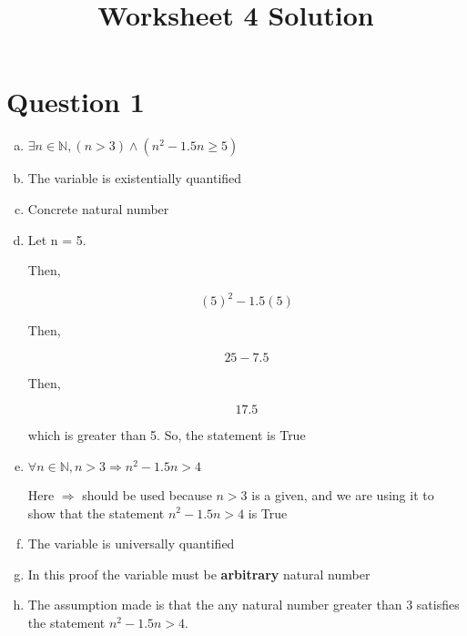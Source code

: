 \documentclass[12pt]{article}
\begin{document}
\title{Worksheet 4 Solution}
\maketitle

\section*{Question 1}
\begin{enumerate}[a.]
    \item $\exists n \in \mathbb{N}, (n > 3) \land (n^2-1.5n \geq 5)$
    \item The variable is existentially quantified
    \item Concrete natural number
    \item

    Let n = 5.

    Then,

    \begin{equation}
        (5)^2 - 1.5(5)
    \end{equation}

    Then,

    \begin{equation}
        25 - 7.5
    \end{equation}

    Then,

    \begin{equation}
        17.5
    \end{equation}

    which is greater than 5. So, the statement is True

    \item

    $\forall n \in \mathbb{N}, n > 3 \Rightarrow n^2 - 1.5n > 4$

    Here $\Rightarrow$ should be used because $n > 3$ is a given, and we are using it to show that the statement $n^2 - 1.5n > 4$ is True

    \item

    The variable is universally quantified

    \item

    In this proof the variable must be \textbf{arbitrary} natural number

    \item

    The assumption made is that the any natural number greater than 3 satisfies the statement $n^2 - 1.5n > 4$.


\end{enumerate}
\end{document}
